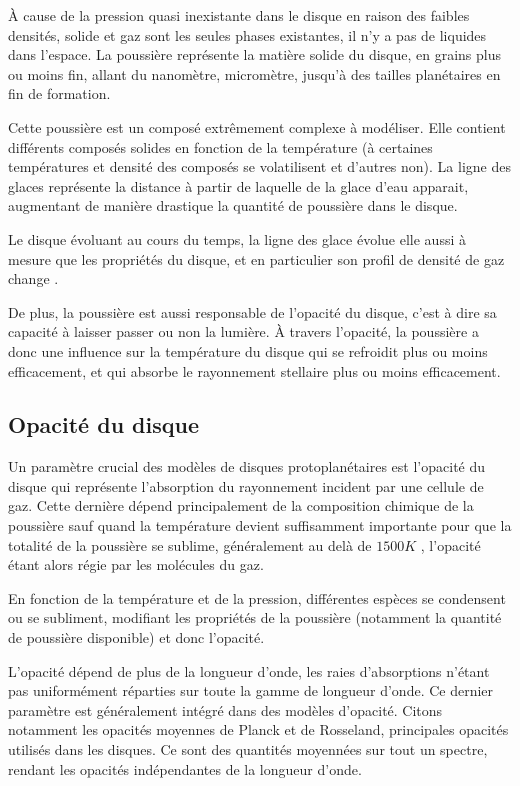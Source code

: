 À cause de la pression quasi inexistante dans le disque en raison des faibles densités, solide et gaz sont les seules phases existantes, il n'y a pas de liquides dans l'espace. La poussière représente la matière solide du disque, en grains plus ou moins fin, allant du nanomètre, micromètre, jusqu'à des tailles planétaires en fin de formation. 

Cette poussière est un composé extrêmement complexe à modéliser. Elle contient différents composés solides en fonction de la température (à certaines températures et densité des composés se volatilisent et d'autres non). La ligne des glaces représente la distance à partir de laquelle de la glace d'eau apparait, augmentant de manière drastique la quantité de poussière dans le disque. 

Le disque évoluant au cours du temps, la ligne des glace évolue elle aussi à mesure que les propriétés du disque, et en particulier son profil de densité de gaz change \citep{dodsonrobinson2009icelines}.

\bigskip

De plus, la poussière est aussi responsable de l'opacité du disque, c'est à dire sa capacité à laisser passer ou non la lumière. À travers l'opacité, la poussière a donc une influence sur la température du disque qui se refroidit plus ou moins efficacement, et qui absorbe le rayonnement stellaire plus ou moins efficacement. 

\subsection{Opacité du disque}\label{sec:opacity}
Un paramètre crucial des modèles de disques protoplanétaires est l'opacité du disque qui représente l'absorption du rayonnement incident par une cellule de gaz. Cette dernière dépend principalement de la composition chimique de la poussière sauf quand la température devient suffisamment importante pour que la totalité de la poussière se sublime, généralement au delà de $1500\unit{K}$ \citep{pollack1994composition}, l'opacité étant alors régie par les molécules du gaz.

En fonction de la température et de la pression, différentes espèces se condensent ou se subliment, modifiant les propriétés de la poussière (notamment la quantité de poussière disponible) et donc l'opacité.

L'opacité dépend de plus de la longueur d'onde, les raies d'absorptions n'étant pas uniformément réparties sur toute la gamme de longueur d'onde. Ce dernier paramètre est généralement intégré dans des modèles d'opacité. Citons notamment les opacités moyennes de Planck et de Rosseland, principales opacités utilisés dans les disques. Ce sont des quantités moyennées sur tout un spectre, rendant les opacités indépendantes de la longueur d'onde. 

